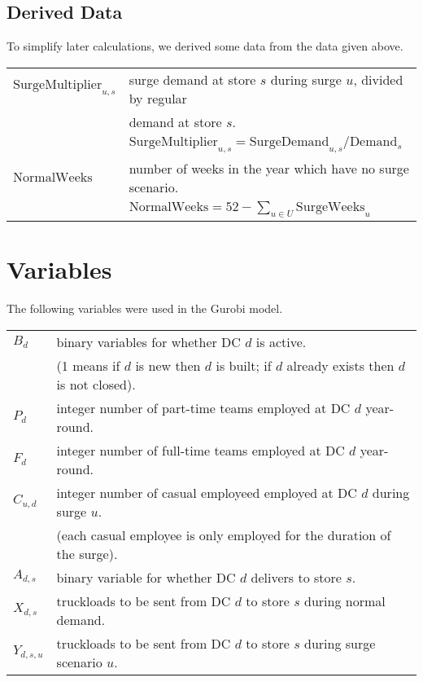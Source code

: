 \documentclass[11pt,a4paper]{article}
\begin{document}
\subsection{Derived Data}
To simplify later calculations, we derived some data from the data given above.\\[0.8em]    
\begin{tabular}{l l}
    $\mathrm{SurgeMultiplier}_{u,s}$ & surge demand at store $s$ during surge $u$,  divided by regular \\ 
    &  demand at store $s$. \\ 
    &$\mathrm{SurgeMultiplier}_{u,s} = \mathrm{SurgeDemand}_{u,s} / \mathrm{Demand}_s $ \\
    $\mathrm{NormalWeeks}$ & number of weeks in the year which have no surge scenario. \\ 
    & $\mathrm{NormalWeeks} = 52-\sum_{u \in U} \mathrm{SurgeWeeks}_u $
\end{tabular}

\section{Variables}
The following variables were used in the Gurobi model.\\[0.8em]
\begin{tabular}{l l}
    $B_{d}$ & binary variables for whether DC $d$ is active. \\ 
    & (1 means if $d$ is new then $d$ is built; if $d$ 
    already exists then $d$ is not closed). \\
    $P_d$ & integer number of part-time teams employed at DC $d$ year-round. \\ 
    $F_d$ & integer number of full-time teams employed at DC $d$ year-round. \\ 
    $C_{u,d}$ & integer number of casual employeed employed at DC $d$  during surge $u$. \\
    & (each casual employee is only employed for the duration of the surge). \\ 
    $A_{d,s}$ & binary variable for whether DC $d$ delivers to store $s$. \\  
    $X_{d,s}$ & truckloads to be sent from DC $d$ to store $s$ during normal demand. \\
    $Y_{d,s,u}$ & truckloads to be sent from DC $d$ to store $s$ during 
    surge scenario $u$. 
\end{tabular}
\\[0.8em]
\end{document}
